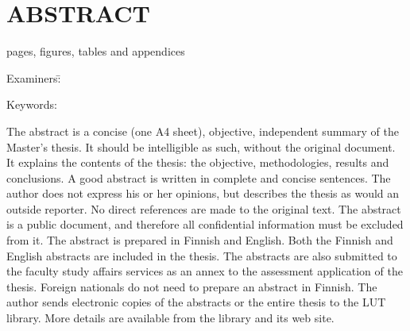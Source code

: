 \section*{ABSTRACT}

\begin{doublespace}

\thesisschool


\thesisauthor

\textbf{\thesistitle}

\thesissubject

\currentyear

 pages,  figures,  tables and 
appendices

\begin{tabbing}
Examiners:\quad\= \thesisfirstexaminer\\
\> \thesissecondexaminer
\end{tabbing}

Keywords: \thesiskeywords
\end{doublespace}

\vspace*{1em}
\nextparagraph
\begin{remarks}
The abstract is a concise (one A4 sheet), objective, independent summary
of the Master’s thesis. It should be intelligible as such, without the original document. 
It explains the contents of the thesis: the objective, methodologies, results and conclusions. 
A good abstract is written in complete and concise sentences. 
The author does not express his or her opinions, but describes the thesis as would an outside reporter. 
No direct references are made to the original text. 
\nextparagraph
The abstract is a public document, and therefore all confidential information must be excluded
from it. The abstract is prepared in Finnish and English. 
Both the Finnish and English abstracts are included in the thesis. 
\nextparagraph
The abstracts are also submitted to the faculty study affairs services as an annex to the assessment 
application of the thesis.
Foreign nationals do not need to prepare an abstract in Finnish.
\nextparagraph
The author sends electronic copies of the abstracts or the entire thesis to the LUT library. 
More details are available from the library and its web site.
\end{remarks}